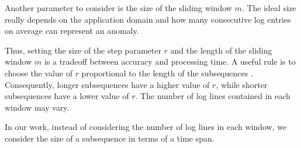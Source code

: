 Another parameter to consider is the size of the sliding window $m$. The ideal size really depends on the application domain and how many consecutive log entries on average can represent an anomaly. 

Thus, setting the size of the step parameter $r$ and the length of the sliding window $m$ is a tradeoff between accuracy and processing time. A useful rule is to choose the value of $r$ proportional to the length of the subsequences \cite{izakian2013}. Consequently, longer subsequences have a higher value of $r$, while shorter subsequences have a lower value of $r$. The number of log lines contained in each window may vary. 

In our work, instead of considering the number of log lines in each window, we consider the size of a subsequence in terms of a time span.

\begin{figure}[!tbp] 
\end{figure}

